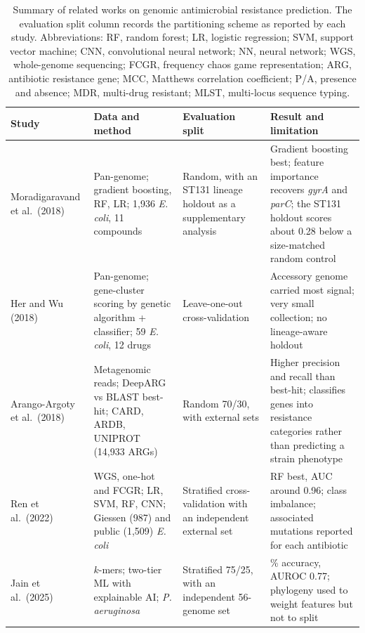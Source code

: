 \documentclass[journal]{IEEEtran}
\begin{document}
\begin{table}[!tb]
\caption{Summary of related works on genomic antimicrobial resistance prediction.
The evaluation split column records the partitioning scheme as reported by each
study. Abbreviations: RF, random forest; LR, logistic regression; SVM, support
vector machine; CNN, convolutional neural network; NN, neural network; WGS,
whole-genome sequencing; FCGR, frequency chaos game representation; ARG, antibiotic
resistance gene; MCC, Matthews correlation coefficient; P/A, presence and absence;
MDR, multi-drug resistant; MLST, multi-locus sequence typing.}
\label{tab:summary}
\centering
\footnotesize
\setlength{\tabcolsep}{4pt}
\renewcommand{\arraystretch}{1.05}
\begin{tabular}{|>{\raggedright\arraybackslash}p{2.6cm}|>{\raggedright\arraybackslash}p{4.6cm}|>{\raggedright\arraybackslash}p{2.6cm}|>{\raggedright\arraybackslash}p{6.4cm}|}
\hline
\rowcolor{headgrey}
\textbf{Study} & \textbf{Data and method} & \textbf{Evaluation split} & \textbf{Result and limitation} \\ \hline
Moradigaravand et al.\ (2018) \cite{moradigaravand2018} & Pan-genome; gradient boosting, RF, LR; 1,936 \textit{E. coli}, 11 compounds & Random, with an ST131 lineage holdout as a supplementary analysis & Gradient boosting best; feature importance recovers \textit{gyrA} and \textit{parC}; the ST131 holdout scores about 0.28 below a size-matched random control \\ \hline
Her and Wu (2018) \cite{her2018pangenome} & Pan-genome; gene-cluster scoring by genetic algorithm + classifier; 59 \textit{E. coli}, 12 drugs & Leave-one-out cross-validation & Accessory genome carried most signal; very small collection; no lineage-aware holdout \\ \hline
Arango-Argoty et al.\ (2018) \cite{ArangoArgoty2018} & Metagenomic reads; DeepARG vs BLAST best-hit; CARD, ARDB, UNIPROT (14,933 ARGs) & Random 70/30, with external sets & Higher precision and recall than best-hit; classifies genes into resistance categories rather than predicting a strain phenotype \\ \hline
Ren et al.\ (2022) \cite{Ren2022} & WGS, one-hot and FCGR; LR, SVM, RF, CNN; Giessen (987) and public (1,509) \textit{E. coli} & Stratified cross-validation with an independent external set & RF best, AUC around 0.96; class imbalance; associated mutations reported for each antibiotic \\ \hline
Jain et al.\ (2025) \cite{jain2025paeruginosa} & $k$-mers; two-tier ML with explainable AI; \textit{P. aeruginosa} & Stratified 75/25, with an independent 56-genome set & 79\% accuracy, AUROC 0.77; phylogeny used to weight features but not to split \\ \hline

\end{tabular}
\end{table}
\end{document}
